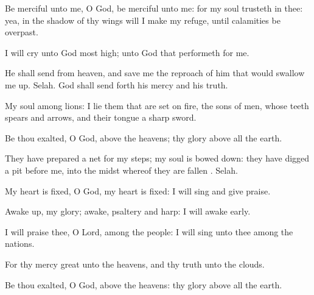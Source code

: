 {\Q {}Be
merciful unto me, O
God, be
merciful unto me: for my
soul
trusteth in thee: yea, in the
shadow of thy
wings will I make my
refuge, until
{}
calamities be
overpast.


\par }{\Q {}I will
cry unto
God most
high; unto
God that
performeth
{} for me.


\par }{\Q {}He shall
send from
heaven, and
save me
{} the
reproach of him that would swallow me
up.
Selah.
God shall send
forth his
mercy and his
truth.


\par }{\Q {}My
soul
{}
among
lions:
{} I
lie
{} them that are set on
fire,
{} the
sons of
men, whose
teeth
{}
spears and
arrows, and their
tongue a
sharp
sword.


\par }{\Q {}Be thou
exalted, O
God, above the
heavens;
{} thy
glory
{} above all the
earth.


\par }{\Q {}They have
prepared a
net for my
steps; my
soul is bowed
down: they have
digged a
pit
before me, into the
midst whereof they are
fallen
{}.
Selah.


\par }{\BB \par }
{\Q {}My
heart is
fixed, O
God, my
heart is
fixed: I will
sing and give
praise.


\par }{\Q {}Awake
up, my
glory;
awake,
psaltery and
harp: I
{} will
awake
early.


\par }{\Q {}I will
praise thee, O
Lord, among the
people: I will
sing unto thee among the
nations.


\par }{\Q {}For thy
mercy
{}
great unto the
heavens, and thy
truth unto the
clouds.


\par }{\Q {}Be thou
exalted, O
God, above the
heavens:
{} thy
glory
{} above all the
earth.




\par }
